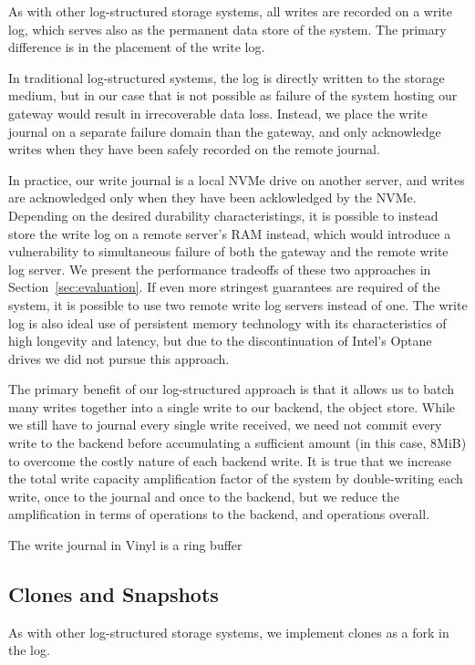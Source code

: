 As with other log-structured storage systems, all writes are recorded on a
write log, which serves also as the permanent data store of the system. The
primary difference is in the placement of the write log.

In traditional log-structured systems, the log is directly written to the
storage medium, but in our case that is not possible as failure of the system
hosting our gateway would result in irrecoverable data loss. Instead, we place
the write journal on a separate failure domain than the gateway, and only
acknowledge writes when they have been safely recorded on the remote journal.

In practice, our write journal is a local NVMe drive on another server, and
writes are acknowledged only when they have been acklowledged by the NVMe.
Depending on the desired durability characteristings, it is possible to instead
store the write log on a remote server's RAM instead, which would introduce a
vulnerability to simultaneous failure of both the gateway and the remote write
log server. We present the performance tradeoffs of these two approaches in
Section~\ref{sec:evaluation}. If even more stringest guarantees are required of
the system, it is possible to use two remote write log servers instead of one.
 The write log is also ideal use of persistent memory
technology with its characteristics of high longevity and latency, but due to
the discontinuation of Intel's Optane drives we did not pursue this approach.

The primary benefit of our log-structured approach is that it allows us to batch
many writes together into a single write to our backend, the object store. While
we still have to journal every single write received, we need not commit every
write to the backend before accumulating a sufficient amount (in this case,
8MiB) to overcome the costly nature of each backend write. It is true that we
increase the total write capacity amplification factor of the system by
double-writing each write, once to the journal and once to the backend, but we
reduce the amplification in terms of operations to the backend, and operations
overall.

The write journal in Vinyl is a ring buffer 

\subsection{Clones and Snapshots}

As with other log-structured storage systems, we implement clones as a fork in
the log. 

